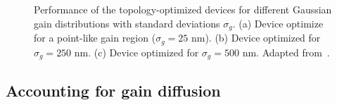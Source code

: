 \begin{figure}[tb]
    \centering
    \caption{Performance of the topology-optimized devices for different Gaussian gain distributions with standard deviations $\sigma_g$. (a) Device optimize for a point-like gain region ($\sigma_g=25$ nm).
    (b) Device optimized for $\sigma_g=250$ nm. (c) Device optimized for $\sigma_g=500$ nm. Adapted from~\cite{ownpub4}.}
    \label{fig:laser_size}
\end{figure}

\subsection*{Accounting for gain diffusion}

